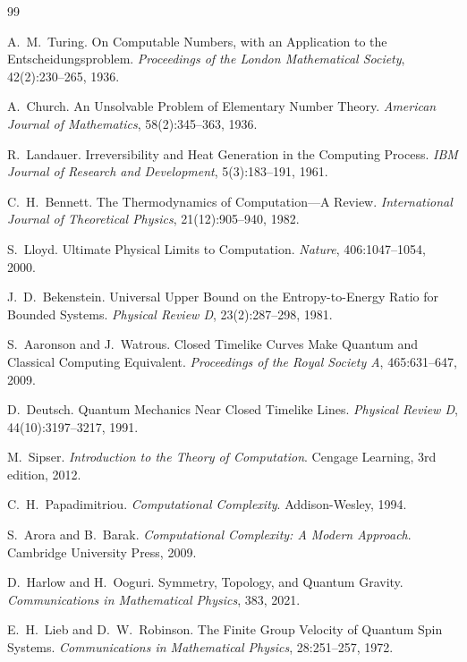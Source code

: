 \documentclass[11pt,a4paper]{article}
\begin{document}
\begin{thebibliography}{99}

A.~M.~Turing.
\newblock On Computable Numbers, with an Application to the Entscheidungsproblem.
\newblock \emph{Proceedings of the London Mathematical Society}, 42(2):230–265, 1936.

A.~Church.
\newblock An Unsolvable Problem of Elementary Number Theory.
\newblock \emph{American Journal of Mathematics}, 58(2):345–363, 1936.

R.~Landauer.
\newblock Irreversibility and Heat Generation in the Computing Process.
\newblock \emph{IBM Journal of Research and Development}, 5(3):183–191, 1961.

C.~H.~Bennett.
\newblock The Thermodynamics of Computation—A Review.
\newblock \emph{International Journal of Theoretical Physics}, 21(12):905–940, 1982.

S.~Lloyd.
\newblock Ultimate Physical Limits to Computation.
\newblock \emph{Nature}, 406:1047–1054, 2000.

J.~D.~Bekenstein.
\newblock Universal Upper Bound on the Entropy-to-Energy Ratio for Bounded Systems.
\newblock \emph{Physical Review D}, 23(2):287–298, 1981.

S.~Aaronson and J.~Watrous.
\newblock Closed Timelike Curves Make Quantum and Classical Computing Equivalent.
\newblock \emph{Proceedings of the Royal Society A}, 465:631–647, 2009.

D.~Deutsch.
\newblock Quantum Mechanics Near Closed Timelike Lines.
\newblock \emph{Physical Review D}, 44(10):3197–3217, 1991.

M.~Sipser.
\newblock \emph{Introduction to the Theory of Computation}.
\newblock Cengage Learning, 3rd edition, 2012.

C.~H.~Papadimitriou.
\newblock \emph{Computational Complexity}.
\newblock Addison-Wesley, 1994.

S.~Arora and B.~Barak.
\newblock \emph{Computational Complexity: A Modern Approach}.
\newblock Cambridge University Press, 2009.

D.~Harlow and H.~Ooguri.
\newblock Symmetry, Topology, and Quantum Gravity.
\newblock \emph{Communications in Mathematical Physics}, 383, 2021.

E.~H.~Lieb and D.~W.~Robinson.
\newblock The Finite Group Velocity of Quantum Spin Systems.
\newblock \emph{Communications in Mathematical Physics}, 28:251–257, 1972.


\end{thebibliography}
\end{document}
